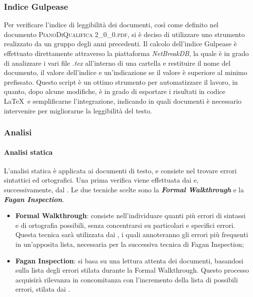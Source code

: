 		\subsubsection{Indice Gulpease}
		Per verificare l'indice di leggibilità dei documenti, così come definito nel documento \textsc{PianoDiQualifica 2\_0\_0.pdf}, si è deciso di utilizzare uno strumento realizzato da un gruppo degli anni precedenti. Il calcolo dell'indice Gulpease è effettuato direttamente attraverso la piattaforma \textit{NetBreakDB}, la quale è in grado di analizzare i vari file \textit{.tex} all'interno di una cartella e restituire il nome del documento, il valore dell'indice e un'indicazione se il valore è superiore al minimo prefissato. 
		Questo script è un ottimo strumento per automatizzare il lavoro, in quanto, dopo alcune modifiche, è in grado di esportare i risultati in codice \LaTeX\ e semplificarne l'integrazione, indicando in quali documenti è necessario intervenire per migliorarne la leggibilità del testo.
		
		\subsubsection{Analisi}

			\paragraph{Analisi statica}
			L'analisi statica è applicata ai documenti di testo, e consiste nel trovare errori sintattici ed ortografici. Una prima verifica viene effettuata dai \textit{\Vers} e, successivamente, dal \textit{\RdP}. Le due tecniche scelte sono la \textbf{\textit{Formal Walkthrough}} e la \textbf{\textit{Fagan Inspection}}.
			\begin{itemize}
				\item \textbf{Formal Walkthrough}: consiste nell'individuare quanti più errori di sintassi e di ortografia possibili, senza concentrarsi su particolari e specifici errori. Questa tecnica sarà utilizzata dai \textit{\Vers}, i quali annoteranno gli errori più frequenti in un'apposita lista, necessaria per la successiva tecnica di Fagan Inspection;
				\item \textbf{Fagan Inspection}: si basa su una lettura attenta dei documenti, basandosi sulla lista degli errori stilata durante la Formal Walkthrough. Questo processo acquisirà rilevanza in concomitanza con l'incremento della lista di possibili errori, stilata dai \textit{\Vers}.
			\end{itemize}

